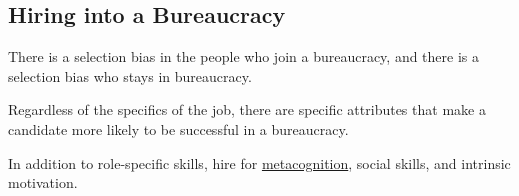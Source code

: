 \subsection{Hiring into a Bureaucracy}

There is a selection bias in the people who join a bureaucracy, and there is a selection bias who stays in bureaucracy.

Regardless of the specifics of the job, there are specific attributes that make a candidate more likely to be successful in a bureaucracy. 

In addition to role-specific skills, hire for \href{https://en.wikipedia.org/wiki/Metacognition}{metacognition}, social skills, and intrinsic motivation.




